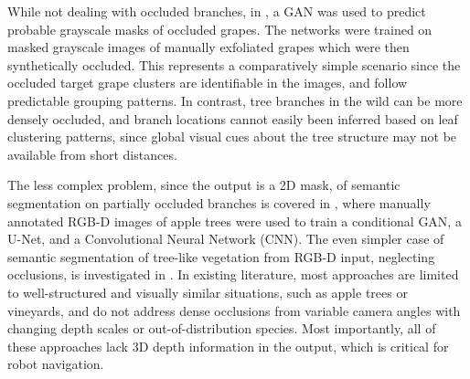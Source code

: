 While not dealing with occluded branches, in \cite{Kierdorf2022}, a GAN was used to predict probable grayscale masks of occluded grapes. The networks were trained on masked grayscale images of manually exfoliated grapes which were then synthetically occluded. This represents a comparatively simple scenario since the occluded target grape clusters are identifiable in the images, and follow predictable grouping patterns. In contrast, tree branches in the wild can be more densely occluded, and branch locations cannot easily been inferred based on leaf clustering patterns, since global visual cues about the tree structure may not be available from short distances. 

The less complex problem, since the output is a 2D mask, of semantic segmentation on partially occluded branches is covered in \cite{Chen2021d}, where manually annotated RGB-D images of apple trees were used to train a conditional GAN, a U-Net, and a Convolutional Neural Network (CNN). The even simpler case of semantic segmentation of tree-like vegetation from RGB-D input, neglecting occlusions, is investigated in \cite{TejaswiDigumarti2019}.
In existing literature, most approaches are limited to well-structured and visually similar situations, such as apple trees or vineyards, and do not address dense occlusions from variable camera angles with changing depth scales or out-of-distribution species. Most importantly, all of these approaches lack 3D depth information in the output, which is critical for robot navigation.

